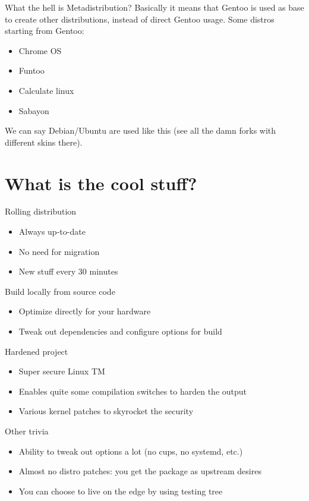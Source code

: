 \documentclass{beamer}
\begin{document}
\begin{frame}{What the hell is Metadistribution?}
	Basically it means that Gentoo is used as base to create other distributions, instead of direct Gentoo usage.
	Some distros starting from Gentoo:
	\begin{itemize}
		\item Chrome OS
		\item Funtoo
		\item Calculate linux
		\item Sabayon
	\end{itemize}
	We can say Debian/Ubuntu are used like this (see all the damn forks with different skins there).
\end{frame}

\section{What is the cool stuff?}
\begin{frame}{Rolling distribution}
	\begin{itemize}
		\item Always up-to-date
		\item No need for migration
		\item New stuff every 30 minutes
	\end{itemize}
\end{frame}

\begin{frame}{Build locally from source code}
	\begin{itemize}
		\item Optimize directly for your hardware
		\item Tweak out dependencies and configure options for build
	\end{itemize}
\end{frame}

\begin{frame}{Hardened project}
	\begin{itemize}
		\item Super secure Linux TM
		\item Enables quite some compilation switches to harden the output
		\item Various kernel patches to skyrocket the security
	\end{itemize}
\end{frame}

\begin{frame}{Other trivia}
	\begin{itemize}
		\item Ability to tweak out options a lot (no cups, no systemd, etc.)
		\item Almost no distro patches: you get the package as upstream desires
		\item You can choose to live on the edge by using testing tree
	\end{itemize}
\end{frame}
\end{document}
